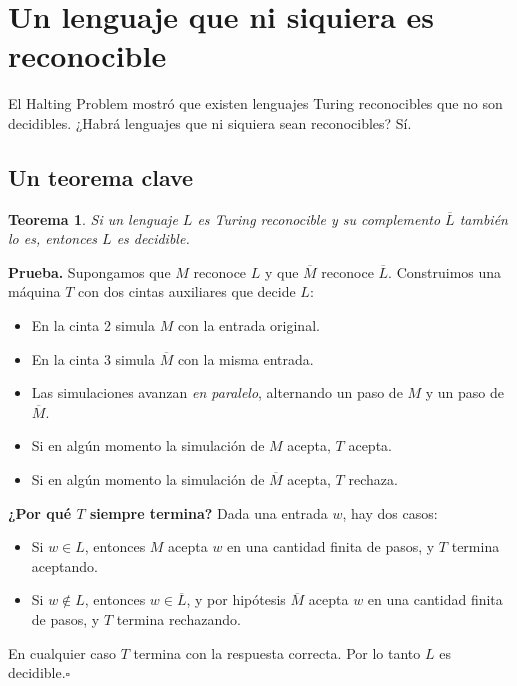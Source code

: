 \documentclass[11pt,a4paper]{article}
\theoremstyle{definicion}
\newtheorem{teorema}[definicion]{Teorema}
\begin{document}
\section{Un lenguaje que ni siquiera es reconocible}

El Halting Problem mostró que existen lenguajes Turing reconocibles que no son decidibles. ¿Habrá lenguajes que ni siquiera sean reconocibles? Sí.

\subsection{Un teorema clave}

\begin{teorema}\label{teo:complemento}
Si un lenguaje $L$ es Turing reconocible y su complemento $\overline{L}$ también lo es, entonces $L$ es decidible.
\end{teorema}

\textbf{Prueba.} Supongamos que $M$ reconoce $L$ y que $\overline{M}$ reconoce $\overline{L}$. Construimos una máquina $T$ con dos cintas auxiliares que decide $L$:

\begin{itemize}
    \item En la cinta 2 simula $M$ con la entrada original.
    \item En la cinta 3 simula $\overline{M}$ con la misma entrada.
    \item Las simulaciones avanzan \emph{en paralelo}, alternando un paso de $M$ y un paso de $\overline{M}$.
    \item Si en algún momento la simulación de $M$ acepta, $T$ acepta.
    \item Si en algún momento la simulación de $\overline{M}$ acepta, $T$ rechaza.
\end{itemize}

\textbf{¿Por qué $T$ siempre termina?} Dada una entrada $w$, hay dos casos:
\begin{itemize}
    \item Si $w \in L$, entonces $M$ acepta $w$ en una cantidad finita de pasos, y $T$ termina aceptando.
    \item Si $w \notin L$, entonces $w \in \overline{L}$, y por hipótesis $\overline{M}$ acepta $w$ en una cantidad finita de pasos, y $T$ termina rechazando.
\end{itemize}

En cualquier caso $T$ termina con la respuesta correcta. Por lo tanto $L$ es decidible.\hfill$\square$
\end{document}
